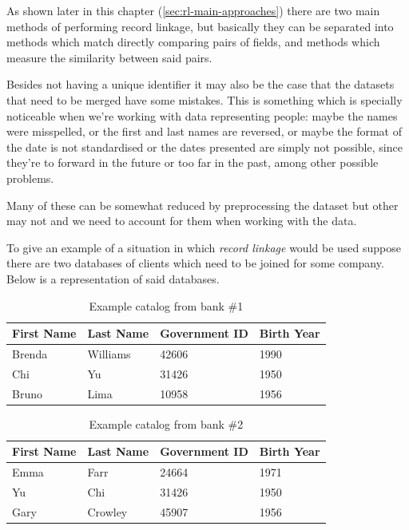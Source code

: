 \documentclass[epsfig,a4paper,11pt,titlepage,twoside,openany]{book}
\begin{document}
As shown later in this chapter
(\autoref{sec:rl-main-approaches}) there are two main methods of performing
record linkage, but basically they can be separated into methods which match
directly comparing pairs of fields, and methods which measure the similarity
between said pairs.

Besides not having a unique identifier it may also be the case that the datasets
that need to be merged have some mistakes. This is something which is specially
noticeable when we're working with data representing people: maybe the names
were misspelled, or the first and last names are reversed, or maybe the format
of the date is not standardised or the dates presented are simply not possible,
since they're to forward in the future or too far in the past, among other possible
problems. 

Many of these can be somewhat reduced by preprocessing the dataset but
other may not and we need to account for them when working with the data.


To give an example of a situation in which \textit{record linkage} would be used
suppose there are two databases of clients which need to be joined for some company. Below is a
representation of said databases.

\begin{table}[H]
  \centering{}
  \begin{tabular}{l|l|l|l}
    First Name & Last Name & Government ID & Birth Year \\ \hline
    Brenda     & Williams  & 42606         & 1990       \\
    Chi        & Yu        & 31426         & 1950       \\
    Bruno      & Lima      & 10958         & 1956      
  \end{tabular}
  \caption{Example catalog from bank \#1}
  \label{tab:ex-catalog-1}
\end{table}


\begin{table}[H]
  \centering{}
  \begin{tabular}{l|l|l|l}
    First Name & Last Name & Government ID & Birth Year \\ \hline
    Emma       & Farr      & 24664         & 1971       \\
    Yu         & Chi       & 31426         & 1950       \\
    Gary       & Crowley   & 45907         & 1956      
  \end{tabular}
  \caption{Example catalog from bank \#2}
  \label{tab:ex-catalog-2}
\end{table}
\end{document}
